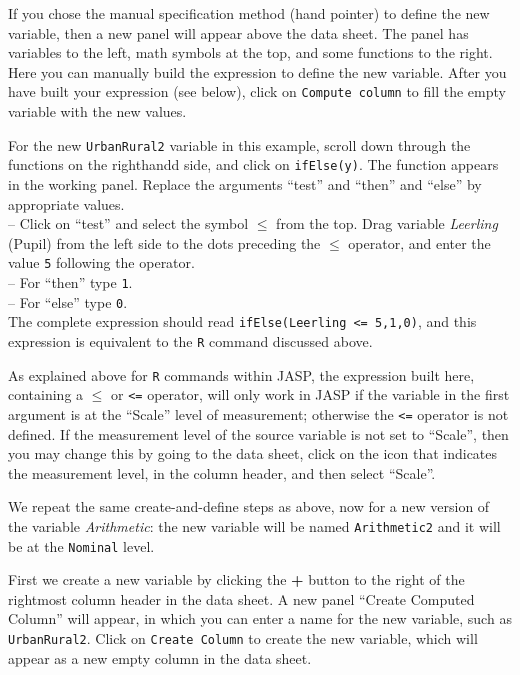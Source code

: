 \documentclass[
]{book}
\begin{document}
If you chose the manual specification method (hand pointer) to define the new variable, then a new panel will appear above the data sheet. The panel has variables to the left, math symbols at the top, and some functions to the right. Here you can manually build the expression to define the new variable. After you have built your expression (see below), click on \texttt{Compute\ column} to fill the empty variable with the new values.

For the new \texttt{UrbanRural2} variable in this example, scroll down through the functions on the righthandd side, and click on \texttt{ifElse(y)}. The function appears in the working panel. Replace the arguments ``test'' and ``then'' and ``else'' by appropriate values.\\
-- Click on ``test'' and select the symbol \(\leq\) from the top. Drag variable \emph{Leerling} (Pupil) from the left side to the dots preceding the \(\leq\) operator, and enter the value \texttt{5} following the operator.\\
-- For ``then'' type \texttt{1}.\\
-- For ``else'' type \texttt{0}.\\
The complete expression should read \texttt{ifElse(Leerling\ \textless{}=\ 5,1,0)}, and this expression is equivalent to the \texttt{R} command discussed above.

As explained above for \texttt{R} commands within JASP, the expression built here, containing a \(\leq\) or \texttt{\textless{}=} operator, will only work in JASP if the variable in the first argument is at the ``Scale'' level of measurement; otherwise the \texttt{\textless{}=} operator is not defined. If the measurement level of the source variable is not set to ``Scale'', then you may change this by going to the data sheet, click on the icon that indicates the measurement level, in the column header, and then select ``Scale''.

We repeat the same create-and-define steps as above, now for a new version of the variable \emph{Arithmetic}: the new variable will be named \texttt{Arithmetic2} and it will be at the \texttt{Nominal} level.

First we create a new variable by clicking the \textbf{+} button to the right of the rightmost column header in the data sheet. A new panel ``Create Computed Column'' will appear, in which you can enter a name for the new variable, such as \texttt{UrbanRural2}. Click on \texttt{Create\ Column} to create the new variable, which will appear as a new empty column in the data sheet.
\end{document}
